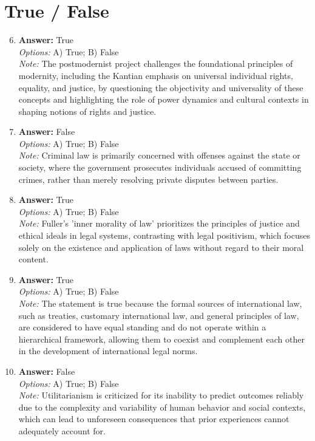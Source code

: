 \documentclass[12pt]{article}
\begin{document}
\section*{True / False}
\begin{enumerate}[label=\arabic*.]
\setcounter{enumi}{5}
\item \textbf{Answer:} True
\\ \textit{Options:} A) True; B) False
\\ \textit{Note:} The postmodernist project challenges the foundational principles of modernity, including the Kantian emphasis on universal individual rights, equality, and justice, by questioning the objectivity and universality of these concepts and highlighting the role of power dynamics and cultural contexts in shaping notions of rights and justice.
\item \textbf{Answer:} False
\\ \textit{Options:} A) True; B) False
\\ \textit{Note:} Criminal law is primarily concerned with offenses against the state or society, where the government prosecutes individuals accused of committing crimes, rather than merely resolving private disputes between parties.
\item \textbf{Answer:} True
\\ \textit{Options:} A) True; B) False
\\ \textit{Note:} Fuller's 'inner morality of law' prioritizes the principles of justice and ethical ideals in legal systems, contrasting with legal positivism, which focuses solely on the existence and application of laws without regard to their moral content.
\item \textbf{Answer:} True
\\ \textit{Options:} A) True; B) False
\\ \textit{Note:} The statement is true because the formal sources of international law, such as treaties, customary international law, and general principles of law, are considered to have equal standing and do not operate within a hierarchical framework, allowing them to coexist and complement each other in the development of international legal norms.
\item \textbf{Answer:} False
\\ \textit{Options:} A) True; B) False
\\ \textit{Note:} Utilitarianism is criticized for its inability to predict outcomes reliably due to the complexity and variability of human behavior and social contexts, which can lead to unforeseen consequences that prior experiences cannot adequately account for.
\end{enumerate}
\end{document}
